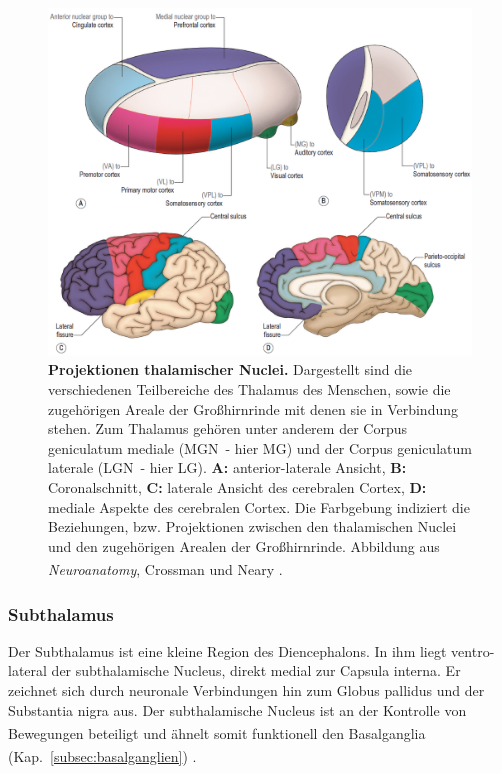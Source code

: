 \begin{figure}[H]
    \centering
    \includegraphics[width=\textwidth]{pictures/Bilder_Jule/Andere/thalamus.png}
    \caption[Projektionen thalamischer Nuclei]{\textbf{Projektionen thalamischer Nuclei.} Dargestellt sind die verschiedenen Teilbereiche des Thalamus des Menschen, sowie die zugehörigen Areale der Großhirnrinde mit denen sie in Verbindung stehen. Zum Thalamus gehören unter anderem der Corpus geniculatum mediale (MGN~- hier MG) und der Corpus geniculatum laterale (LGN~- hier LG). \textbf{A:} anterior-laterale Ansicht, \textbf{B:} Coronalschnitt, \textbf{C:} laterale Ansicht des cerebralen Cortex, \textbf{D:} mediale Aspekte des cerebralen Cortex. Die Farbgebung indiziert die Beziehungen, bzw. Projektionen zwischen den thalamischen Nuclei und den zugehörigen Arealen der Großhirnrinde. Abbildung aus \textit{Neuroanatomy}, Crossman und Neary \textsuperscript{\cite[Kap.~12]{crossman2014neuroanatomy}}.}
    \label{fig:thalamus_nuclei}
\end{figure}

\subsubsection{Subthalamus} 

Der Subthalamus ist eine kleine Region des Diencephalons. In ihm liegt ventro-lateral der subthalamische Nucleus, direkt medial zur Capsula interna. Er zeichnet sich durch neuronale Verbindungen hin zum Globus pallidus und der Substantia nigra aus. Der subthalamische Nucleus ist an der Kontrolle von Bewegungen beteiligt \textsuperscript{\cite[Kap.~12]{crossman2014neuroanatomy}} und ähnelt somit funktionell den Basalganglia (Kap.~\ref{subsec:basalganglien}) \textsuperscript{\cite[Kap.~16]{crossman2014neuroanatomy}}.

